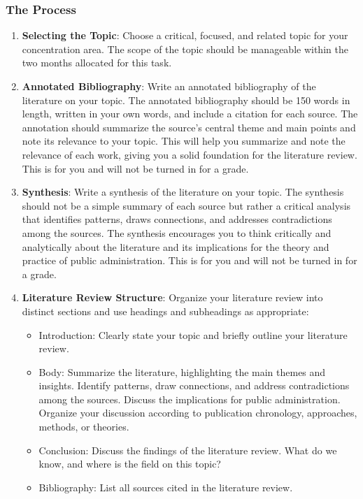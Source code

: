 \documentclass[12pt, letterpaper]{article}
\begin{document}
\subsubsection*{The Process}
    \begin{enumerate}
        \item \textbf{Selecting the Topic}: Choose a critical, focused, and related topic for your concentration area. The scope of the topic should be manageable within the two months allocated for this task.
        \item \textbf{Annotated Bibliography}: Write an annotated bibliography of the literature on your topic. The annotated bibliography should be 150 words in length, written in your own words, and include a citation for each source. The annotation should summarize the source's central theme and main points and note its relevance to your topic. This will help you summarize and note the relevance of each work, giving you a solid foundation for the literature review. This is for you and will not be turned in for a grade.
        \item \textbf{Synthesis}: Write a synthesis of the literature on your topic. The synthesis should not be a simple summary of each source but rather a critical analysis that identifies patterns, draws connections, and addresses contradictions among the sources. The synthesis encourages you to think critically and analytically about the literature and its implications for the theory and practice of public administration. This is for you and will not be turned in for a grade.
        \item \textbf{Literature Review Structure}: Organize your literature review into distinct sections and use headings and subheadings as appropriate:
            \begin{itemize}
                \item Introduction: Clearly state your topic and briefly outline your literature review.
                \item Body: Summarize the literature, highlighting the main themes and insights. Identify patterns, draw connections, and address contradictions among the sources. Discuss the implications for public administration. Organize your discussion according to publication chronology, approaches, methods, or theories.
                \item Conclusion: Discuss the findings of the literature review. What do we know, and where is the field on this topic?
                \item Bibliography: List all sources cited in the literature review.
            \end{itemize}
    \end{enumerate} 
\end{document}
